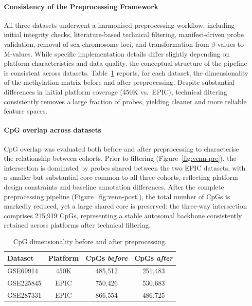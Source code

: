\paragraph{Consistency of the Preprocessing Framework}
All three datasets underwent a harmonised preprocessing workflow, including
initial integrity checks, literature-based technical filtering, manifest-driven
probe validation, removal of sex-chromosome loci, and transformation from
$\beta$-values to M-values. While specific implementation details differ slightly
depending on platform characteristics and data quality, the conceptual structure
of the pipeline is consistent across datasets.
Table~\ref{tab:preprocessing-summary} reports, for each dataset, the
dimensionality of the methylation matrix before and after preprocessing. Despite
substantial differences in initial platform coverage (450K vs.\ EPIC), technical
filtering consistently removes a large fraction of probes, yielding cleaner and
more reliable feature spaces.

\paragraph{CpG overlap across datasets}
CpG overlap was evaluated both before and after preprocessing to characterise
the relationship between cohorts. Prior to filtering
(Figure~\ref{fig:venn-pre}), the intersection is dominated by probes shared
between the two EPIC datasets, with a smaller but substantial core common to
all three cohorts, reflecting platform design constraints and baseline
annotation differences. After the complete preprocessing pipeline
(Figure~\ref{fig:venn-post}), the total number of CpGs is markedly reduced,
yet a large shared core is preserved: the three-way intersection comprises
215{,}919 CpGs, representing a stable autosomal backbone consistently
retained across platforms after technical filtering.


\begin{table}[t]
\centering
\caption{CpG dimensionality before and after preprocessing.}
\label{tab:preprocessing-summary}
\scriptsize
\begin{tabular}{l c c c}
\toprule
Dataset & Platform & CpGs \textit{before} & CpGs \textit{after} \\
\midrule
GSE69914  & 450K & 485{,}512 & 251{,}483 \\
GSE225845 & EPIC & 750{,}426 & 530{,}683 \\
GSE287331 & EPIC & 866{,}554 & 486{,}725 \\
\bottomrule
\end{tabular}
\end{table}

